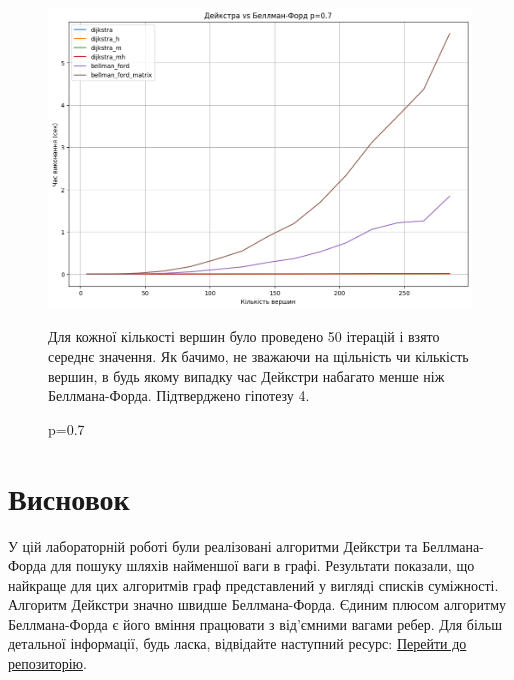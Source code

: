 \documentclass[a4paper,12pt]{article}
\begin{document}
\begin{figure}[ht]
    
    \vspace{10pt} 
    \begin{minipage}{0.45\textwidth}
        \centering
        \includegraphics[width=\textwidth]{img/all07.png}
        \caption{p=0.7}
        \label{fig:all07}
    \end{minipage}

    Для кожної кількості вершин було проведено 50 ітерацій і взято середнє значення. Як бачимо, не зважаючи на щільність чи кількість вершин, в будь якому випадку час 
    Дейкстри набагато менше ніж Беллмана-Форда. Підтверджено гіпотезу 4.
\end{figure}
\clearpage
\section{Висновок}
У цій лабораторній роботі були реалізовані алгоритми Дейкстри та Беллмана-Форда для пошуку шляхів найменшої ваги в графі. 
Результати показали, що найкраще для цих алгоритмів граф представлений у вигляді списків суміжності. Алгоритм Дейкстри значно швидше Беллмана-Форда. 
Єдиним плюсом алгоритму Беллмана-Форда є його вміння працювати з від'ємними вагами ребер.
Для більш детальної інформації, будь ласка, відвідайте наступний ресурс:
\href{https://github.com/gre1wy/AppliedAlgorithms/tree/main/lab3}{Перейти до репозиторію}.
\end{document}

